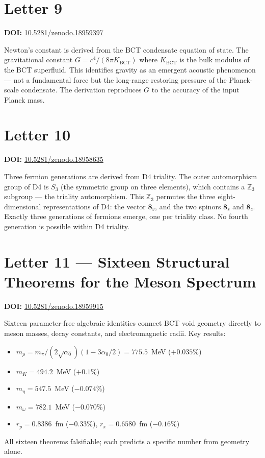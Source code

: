 \documentclass[aps,prl,twocolumn,showpacs,preprintnumbers]{revtex4-2}
\begin{document}
\section{Letter 9}
\noindent\textbf{DOI:} \href{https://doi.org/10.5281/zenodo.18959397}{10.5281/zenodo.18959397}

\medskip
Newton's constant is derived from the BCT condensate equation of
state. The gravitational constant $G = c^4/(8\pi K_{\mathrm{BCT}})$
where $K_{\mathrm{BCT}}$ is the bulk modulus of the BCT superfluid.
This identifies gravity as an emergent acoustic phenomenon --- not
a fundamental force but the long-range restoring pressure of the
Planck-scale condensate. The derivation reproduces $G$ to the
accuracy of the input Planck mass.

\section{Letter 10}
\noindent\textbf{DOI:} \href{https://doi.org/10.5281/zenodo.18958635}{10.5281/zenodo.18958635}

\medskip
Three fermion generations are derived from D4 triality. The outer
automorphism group of D4 is $S_3$ (the symmetric group on three
elements), which contains a $\mathbb{Z}_3$ subgroup --- the triality
automorphism. This $\mathbb{Z}_3$ permutes the three eight-dimensional
representations of D4: the vector $\mathbf{8}_v$, and the two spinors
$\mathbf{8}_s$ and $\mathbf{8}_c$. Exactly three generations of
fermions emerge, one per triality class. No fourth generation is
possible within D4 triality.

\section{Letter 11 --- Sixteen Structural Theorems for the Meson Spectrum}
\noindent\textbf{DOI:} \href{https://doi.org/10.5281/zenodo.18959915}{10.5281/zenodo.18959915}

\medskip
Sixteen parameter-free algebraic identities connect BCT void geometry
directly to meson masses, decay constants, and electromagnetic radii.
Key results:
\begin{itemize}
  \item $m_\rho = m_\pi/(2\sqrt{\alpha_0})(1-3\alpha_0/2) = 775.5$~MeV ($+0.035\%$)
  \item $m_K = 494.2$~MeV ($+0.1\%$)
  \item $m_\eta = 547.5$~MeV ($-0.074\%$)
  \item $m_\omega = 782.1$~MeV ($-0.070\%$)
  \item $r_p = 0.8386$~fm ($-0.33\%$), $r_\pi = 0.6580$~fm ($-0.16\%$)
\end{itemize}
All sixteen theorems falsifiable; each predicts a specific number
from geometry alone.
\end{document}
